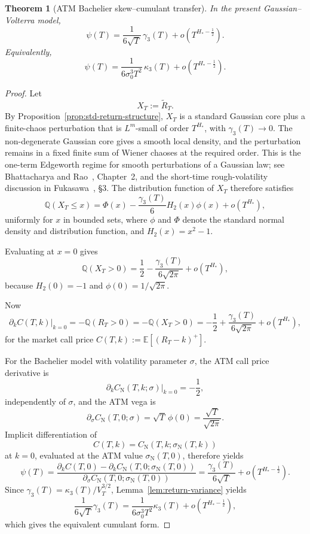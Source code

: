 \documentclass[11pt,a4paper]{amsart}
\theoremstyle{plain}
\newtheorem{theorem}{Theorem}[section]
\theoremstyle{definition}
\theoremstyle{remark}
\newcommand{\Q}{\mathbb{Q}}
\newcommand{\EE}{\mathbb{E}}
\begin{document}
\begin{theorem}[ATM Bachelier skew--cumulant transfer]\label{thm:skew_cumulant_transfer}
In the present Gaussian--Volterra model,
\[
\psi(T)
=
\frac{1}{6\sqrt{T}}\,\gamma_3(T)
+
o\!\left(T^{H_*-\frac12}\right).
\]
Equivalently,
\[
\psi(T)
=
\frac{1}{6\sigma_0^3T^2}\,\kappa_3(T)
+
o\!\left(T^{H_*-\frac12}\right).
\]
\end{theorem}

\begin{proof}
Let
\[
X_T:=\widetilde R_T.
\]
By Proposition~\ref{prop:std-return-structure}, \(X_T\) is a standard Gaussian core plus a
finite-chaos perturbation that is \(L^m\)-small of order \(T^{H_*}\), with \(\gamma_3(T)\to0\).  The
non-degenerate Gaussian core gives a smooth local density, and the perturbation remains in a fixed
finite sum of Wiener chaoses at the required order.  This is the one-term Edgeworth regime for
smooth perturbations of a Gaussian law; see Bhattacharya and Rao~\cite{BR76}, Chapter~2, and the
short-time rough-volatility discussion in Fukasawa~\cite{Fuk17}, \S3.  The distribution function of
\(X_T\) therefore satisfies
\[
\Q(X_T\le x)
=
\Phi(x)
-
\frac{\gamma_3(T)}{6}H_2(x)\phi(x)
+
o(T^{H_*}),
\]
uniformly for $x$ in bounded sets, where $\phi$ and $\Phi$ denote the standard normal density and distribution function, and $H_2(x)=x^2-1$.

Evaluating at $x=0$ gives
\[
\Q(X_T>0)
=
\frac12 - \frac{\gamma_3(T)}{6\sqrt{2\pi}} + o(T^{H_*}),
\]
because $H_2(0)=-1$ and $\phi(0)=1/\sqrt{2\pi}$.

Now
\[
\partial_k C(T,k)\big|_{k=0}
=
-\Q(R_T>0)
=
-\Q(X_T>0)
=
-\frac12 + \frac{\gamma_3(T)}{6\sqrt{2\pi}} + o(T^{H_*}),
\]
for the market call price $C(T,k):=\EE[(R_T-k)^+]$.

For the Bachelier model with volatility parameter $\sigma$, the ATM call price derivative is
\[
\partial_k C_{\mathrm N}(T,k;\sigma)\big|_{k=0}
=
-\frac12,
\]
independently of $\sigma$, and the ATM vega is
\[
\partial_\sigma C_{\mathrm N}(T,0;\sigma)
=
\sqrt{T}\,\phi(0)
=
\frac{\sqrt{T}}{\sqrt{2\pi}}.
\]
Implicit differentiation of
\[
C(T,k)=C_{\mathrm N}(T,k;\sigma_{\mathrm N}(T,k))
\]
at $k=0$, evaluated at the ATM value $\sigma_{\mathrm N}(T,0)$, therefore yields
\[
\psi(T)
=
\frac{\partial_k C(T,0)-\partial_k C_{\mathrm N}(T,0;\sigma_{\mathrm N}(T,0))}
{\partial_\sigma C_{\mathrm N}(T,0;\sigma_{\mathrm N}(T,0))}
=
\frac{\gamma_3(T)}{6\sqrt{T}}
+
o\!\left(T^{H_* - \frac12}\right).
\]
Since \(\gamma_3(T)=\kappa_3(T)/V_T^{3/2}\), Lemma~\ref{lem:return-variance} yields
\[
\frac{1}{6\sqrt T}\gamma_3(T)
=
\frac{1}{6\sigma_0^3T^2}\kappa_3(T)+o\!\left(T^{H_* - \frac12}\right),
\]
which gives the equivalent cumulant form.
\end{proof}
\end{document}
